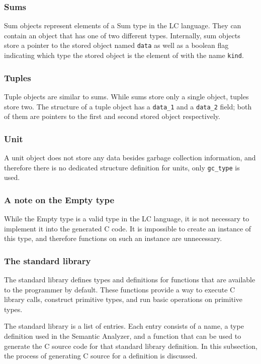 \documentclass[12pt]{article}
\begin{document}
\subsubsection{Sums}

Sum objects represent elements of a Sum type in the LC language. They can
contain an object that has one of two different types. Internally, sum objects
store a pointer to the stored object named \verb$data$ as well as a boolean flag
indicating which type the stored object is the element of with the name
\verb$kind$.

\subsubsection{Tuples}

Tuple objects are similar to sums. While sums store only a single object, tuples
store two. The structure of a tuple object has a \verb$data_1$ and a
\verb$data_2$ field; both of them are pointers to the first and second stored
object respectively.

\subsubsection{Unit}

A unit object does not store any data besides garbage collection information,
and therefore there is no dedicated structure definition for units, only
\verb$gc_type$ is used. 

\subsubsection{A note on the Empty type}

While the Empty type is a valid type in the LC language, it is not necessary to
implement it into the generated C code. It is impossible to create an instance
of this type, and therefore functions on such an instance are unnecessary.

\subsubsection{The standard library}

The standard library defines types and definitions for functions that are
available to the programmer by default. These functions provide a way to execute
C library calls, construct primitive types, and run basic operations on
primitive types.

The standard library is a list of entries. Each entry consists of a name, a type
definition used in the Semantic Analyzer, and a function that can be used to
generate the C source code for that standard library definition. In this
subsection, the process of generating C source for a definition is discussed.
\end{document}
